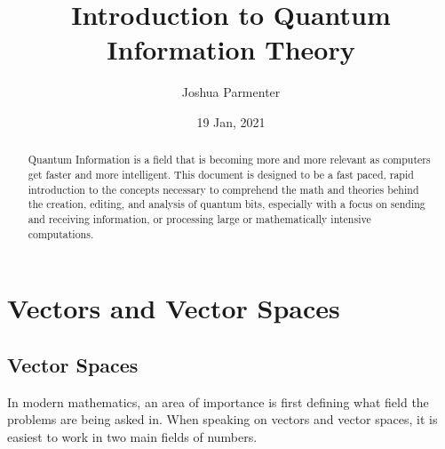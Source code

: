 \documentclass[12pt]{article}
\title{Introduction to Quantum Information Theory}
\author{Joshua Parmenter}
\date{19 Jan, 2021}
\theoremstyle{plain}
\theoremstyle{nonumberplain}
\theoremstyle{plain}
\theoremstyle{nonumberplain}
\newcommand\1{{\bf 1}}
\newcommand{\<}{\left\langle}
\renewcommand{\>}{\right\rangle}
\begin{document}
\maketitle

\begin{abstract}
Quantum Information is a field that is becoming more and more relevant as computers get faster and more intelligent.  This document is designed to be a fast paced, rapid introduction to the concepts necessary to comprehend the math and theories behind the creation, editing, and analysis of quantum bits, especially with a focus on sending and receiving information, or processing large or mathematically intensive computations. 
\end{abstract}

\tableofcontents
\pagebreak

\section{Vectors and Vector Spaces}

\subsection{Vector Spaces}
In modern mathematics, an area of importance is first defining what field the problems are being asked in.  When speaking on vectors and vector spaces, it is easiest to work in two main fields of numbers.
\end{document}
